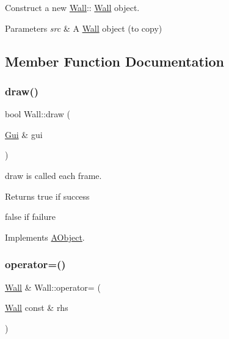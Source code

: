 Construct a new \hyperlink{class_wall}{Wall}\+:\+: \hyperlink{class_wall}{Wall} object. 


\begin{DoxyParams}{Parameters}
{\em src} & A \hyperlink{class_wall}{Wall} object (to copy) \\
\hline
\end{DoxyParams}


\subsection{Member Function Documentation}
\mbox{\label{class_wall_ab3ea42b91f7830d22782901d61be505f}} 
\subsubsection{\texorpdfstring{draw()}{draw()}}
{\footnotesize\ttfamily bool Wall\+::draw (\begin{DoxyParamCaption}\item[{\hyperlink{class_gui}{Gui} \&}]{gui }\end{DoxyParamCaption})\hspace{0.3cm}{\ttfamily [virtual]}}



draw is called each frame. 

\begin{DoxyReturn}{Returns}
true if success 

false if failure 
\end{DoxyReturn}


Implements \hyperlink{class_a_object_a5e454e13e04ee937c20a465244cf748a}{A\+Object}.

\mbox{\label{class_wall_ad5639b5bcbe08c8348dac17d2d5e2af3}} 
\subsubsection{\texorpdfstring{operator=()}{operator=()}}
{\footnotesize\ttfamily \hyperlink{class_wall}{Wall} \& Wall\+::operator= (\begin{DoxyParamCaption}\item[{\hyperlink{class_wall}{Wall} const \&}]{rhs }\end{DoxyParamCaption})}



